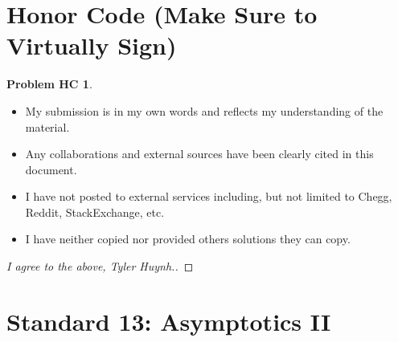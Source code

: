 \documentclass[11pt]{article}
\theoremstyle{definition}
\theoremstyle{definition}
\newtheorem*{requiredHC}{Problem HC}
\theoremstyle{definition}
\newcommand{\standard}{13}
\begin{document}
\newpage
\section*{Honor Code (Make Sure to Virtually Sign)} \label{HonorCode}
\hypertarget{HonorCode}{}

\begin{requiredHC}
\begin{itemize}
\item My submission is in my own words and reflects my understanding of the material.
\item Any collaborations and external sources have been clearly cited in this document.
\item I have not posted to external services including, but not limited to Chegg, Reddit, StackExchange, etc.
\item I have neither copied nor provided others solutions they can copy.
\end{itemize}

\end{requiredHC}

\begin{proof}[I agree to the above, Tyler Huynh.]
\end{proof}


\newpage
\setcounter{section}{\standard-1}
\section{Standard \standard: Asymptotics II}
\end{document}
